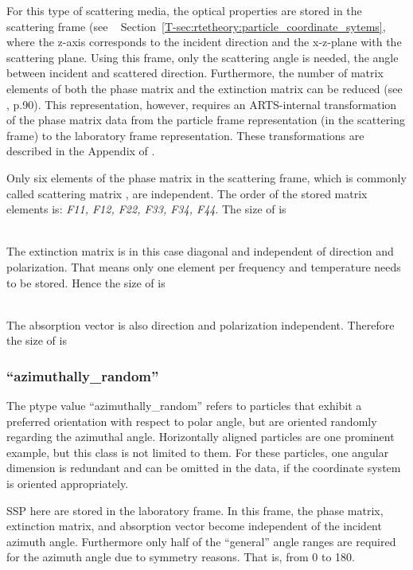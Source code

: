For this type of scattering media, the optical properties are
stored in the scattering frame (see \theory~%
Section~\ref{T-sec:rtetheory:particle_coordinate_sytems}, where the z-axis
corresponds to the incident direction and the x-z-plane with the scattering
plane. Using this frame, only the scattering angle is needed, the angle between
incident and scattered direction. Furthermore, the number of matrix elements of
both the phase matrix and the extinction matrix can be reduced (see
\citet{Mishchenko:02}, p.90). This representation, however, requires an
ARTS-internal transformation of the phase matrix data from the particle frame
representation (in the scattering frame) to the laboratory frame representation.
These transformations are described in the Appendix of
\citet{emde05:_phdthesis}.

Only six elements of the phase matrix in the scattering frame, which is commonly
called scattering matrix \ScaMat, are independent. The order of the stored matrix
elements is: {\sl F11, F12, F22, F33, F34, F44}. The size of
 is

\shortcode{[N\_f N\_T N\_za\_sca 1 1 1 6]}\\
%
The extinction matrix is in this case diagonal and independent of direction and
polarization. That means only one element per frequency and temperature needs to
be stored. Hence the size of  is

\shortcode{[N\_f N\_T 1 1 1]}\\
%
The absorption vector is also direction and polarization independent. Therefore
the size of  is

\shortcode{[N\_f N\_T 1 1 1]}


\subsubsection{``azimuthally\_random''}
The ptype value ``azimuthally\_random'' refers to particles that exhibit a
preferred orientation with respect to polar angle, but are oriented randomly regarding the
azimuthal angle. Horizontally aligned particles are one prominent example, but
this class is not limited to them. For these particles, one angular dimension is
redundant and can be omitted in the data, if the coordinate system is oriented
appropriately.

SSP here are stored in the laboratory frame. In this frame, the phase matrix,
extinction matrix, and absorption vector become independent of the incident
azimuth angle. Furthermore only half of the ``general'' angle ranges are
required for the azimuth angle due to symmetry reasons.
That is,  from 0\degree{} to 180\degree{}.

